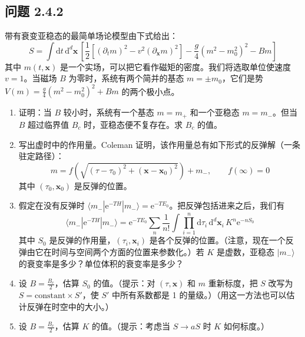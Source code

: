 \subsection*{问题 2.4.2}
带有衰变亚稳态的最简单场论模型由下式给出：
\begin{equation*}
S = \int \mathrm{d}t\, \mathrm{d}^d\pmb{x}\, \left[\frac{1}{2}\left[(\partial_t m)^2 - v^2(\partial_{\pmb{x}} m)^2\right] - \frac{g}{4}(m^2 - m_0^2)^2 - Bm\right]
\end{equation*}
其中 $m(t, \pmb{x})$ 是一个实场，可以把它看作磁矩的密度。我们将选取单位使速度 $v = 1$。当磁场 $B$ 为零时，系统有两个简并的基态 $m = \pm m_0$，它们是势 $V(m) = \frac{g}{4}(m^2 - m_0^2)^2 + Bm$ 的两个极小点。
\begin{enumerate}
\item 证明：当 $B$ 较小时，系统有一个基态 $m = m_+$ 和一个亚稳态 $m = m_-$。但当 $B$ 超过临界值 $B_c$ 时，亚稳态便不复存在。求 $B_c$ 的值。
\item 写出虚时中的作用量。Coleman 证明，该作用量总有如下形式的反弹解（一条驻定路径）：
\begin{equation*}
m = f\left(\sqrt{(\tau - \tau_0)^2 + (\pmb{x} - \pmb{x}_0)^2}\right) + m_-, \qquad f(\infty) = 0
\end{equation*}
其中 $(\tau_0, \pmb{x}_0)$ 是反弹的位置。
\item 假定在没有反弹时 $\langle m_-|\mathrm{e}^{-TH}|m_-\rangle = \mathrm{e}^{-TE_0}$。把反弹包括进来之后，我们有
\begin{equation*}
\langle m_-|\mathrm{e}^{-TH}|m_-\rangle = \mathrm{e}^{-TE_0} \sum_n \frac{1}{n!} \int \prod_{i=1}^n \mathrm{d}\tau_i\, \mathrm{d}^d\pmb{x}_i\, K^n \mathrm{e}^{-nS_0}
\end{equation*}
其中 $S_0$ 是反弹的作用量，$(\tau_i, \pmb{x}_i)$ 是各个反弹的位置。（注意，现在一个反弹由它在时间与空间两个方面的位置来参数化。）若 $K$ 是虚数，亚稳态 $|m_-\rangle$ 的衰变率是多少？单位体积的衰变率是多少？
\item 设 $B = \frac{B_c}{2}$，估算 $S_0$ 的值。（提示：对 $(\tau, \pmb{x})$ 和 $m$ 重新标度，把 $S$ 改写为 $S = \text{constant} \times S'$，使 $S'$ 中所有系数都是 1 的量级。）（用这一方法也可以估计反弹在时空中的大小。）
\item 设 $B = \frac{B_c}{2}$，估算 $K$ 的值。（提示：考虑当 $S \to aS$ 时 $K$ 如何标度。）
\end{enumerate}

